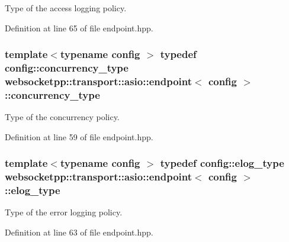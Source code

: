 Type of the access logging policy. 



Definition at line 65 of file endpoint.\+hpp.

\hypertarget{classwebsocketpp_1_1transport_1_1asio_1_1endpoint_aa1979c2199a48526d5bc44651ffc72f3}{}
\subsubsection[{concurrency\+\_\+type}]{\setlength{\rightskip}{0pt plus 5cm}template$<$typename config $>$ typedef config\+::concurrency\+\_\+type {\bf websocketpp\+::transport\+::asio\+::endpoint}$<$ config $>$\+::{\bf concurrency\+\_\+type}}\label{classwebsocketpp_1_1transport_1_1asio_1_1endpoint_aa1979c2199a48526d5bc44651ffc72f3}


Type of the concurrency policy. 



Definition at line 59 of file endpoint.\+hpp.

\hypertarget{classwebsocketpp_1_1transport_1_1asio_1_1endpoint_a2aa93730c801602b55b585121a2898c0}{}
\subsubsection[{elog\+\_\+type}]{\setlength{\rightskip}{0pt plus 5cm}template$<$typename config $>$ typedef config\+::elog\+\_\+type {\bf websocketpp\+::transport\+::asio\+::endpoint}$<$ config $>$\+::{\bf elog\+\_\+type}}\label{classwebsocketpp_1_1transport_1_1asio_1_1endpoint_a2aa93730c801602b55b585121a2898c0}


Type of the error logging policy. 



Definition at line 63 of file endpoint.\+hpp.

\hypertarget{classwebsocketpp_1_1transport_1_1asio_1_1endpoint_acc7e89c6427514628f551cf3f795b7e0}{}
